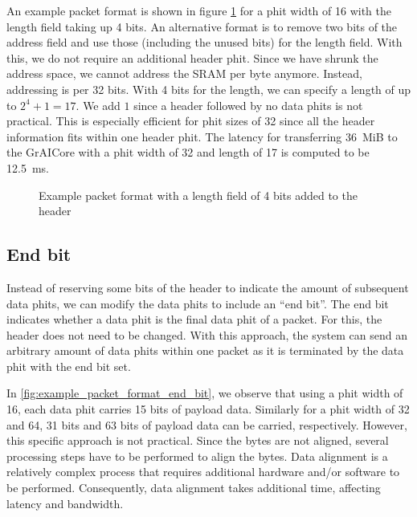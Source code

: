 An example packet format is shown in figure \cref{fig:example_packet_format_length_field} for a phit width of 16 with the length field taking up 4 bits.
An alternative format is to remove two bits of the address field and use those (including the unused bits) for the length field.
With this, we do not require an additional header phit.
Since we have shrunk the address space, we cannot address the SRAM per byte anymore.
Instead, addressing is per 32 bits.
With 4 bits for the length, we can specify a length of up to $2^4 + 1 = 17$.
We add $1$ since a header followed by no data phits is not practical.
This is especially efficient for phit sizes of 32 since all the header information fits within one header phit.
The latency for transferring \SI{36}{MiB} to the GrAICore with a phit width of 32 and length of 17 is computed to be \SI{12.5}{ms}.

\hspace*{0.5em}
\begin{figure}[hbtp]
    \centering
    \begin{adjustbox}{width=0.8\linewidth}
        
    \end{adjustbox}
    \caption{Example packet format with a length field of 4 bits added to the header}
    \label{fig:example_packet_format_length_field}
\end{figure}

\subsection{End bit}
Instead of reserving some bits of the header to indicate the amount of subsequent data phits, we can modify the data phits to include an ``end bit''.
The end bit indicates whether a data phit is the final data phit of a packet.
For this, the header does not need to be changed.
With this approach, the system can send an arbitrary amount of data phits within one packet as it is terminated by the data phit with the end bit set.

In \cref{fig:example_packet_format_end_bit}, we observe that using a phit width of 16, each data phit carries 15 bits of payload data.
Similarly for a phit width of 32 and 64, 31 bits and 63 bits of payload data can be carried, respectively.
However, this specific approach is not practical.
Since the bytes are not aligned, several processing steps have to be performed to align the bytes.
Data alignment is a relatively complex process that requires additional hardware and/or software to be performed.
Consequently, data alignment takes additional time, affecting latency and bandwidth. 

